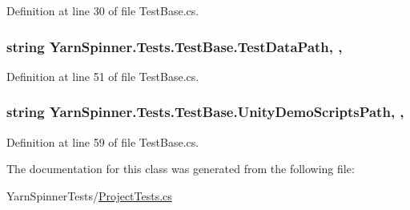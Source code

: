 Definition at line 30 of file Test\-Base.\-cs.

\hypertarget{a00172_aa9b4d902d61adad7165154a265f69aa4}{
\subsubsection[{Test\-Data\-Path}]{\setlength{\rightskip}{0pt plus 5cm}string Yarn\-Spinner.\-Tests.\-Test\-Base.\-Test\-Data\-Path\hspace{0.3cm}{\ttfamily [static]}, {\ttfamily [get]}, {\ttfamily [inherited]}}}\label{a00172_aa9b4d902d61adad7165154a265f69aa4}


Definition at line 51 of file Test\-Base.\-cs.

\hypertarget{a00172_a39922286f6255e4fd0e433a4fc7521c4}{
\subsubsection[{Unity\-Demo\-Scripts\-Path}]{\setlength{\rightskip}{0pt plus 5cm}string Yarn\-Spinner.\-Tests.\-Test\-Base.\-Unity\-Demo\-Scripts\-Path\hspace{0.3cm}{\ttfamily [static]}, {\ttfamily [get]}, {\ttfamily [inherited]}}}\label{a00172_a39922286f6255e4fd0e433a4fc7521c4}


Definition at line 59 of file Test\-Base.\-cs.



The documentation for this class was generated from the following file\-:\begin{DoxyCompactItemize}
\item 
Yarn\-Spinner\-Tests/\hyperlink{a00333}{Project\-Tests.\-cs}\end{DoxyCompactItemize}
